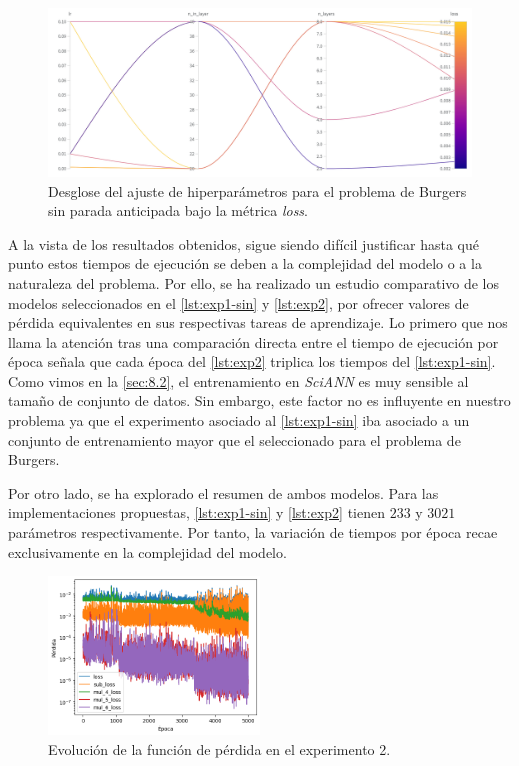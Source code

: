 \begin{figure}[htbp]
    \centering
    \includegraphics[width=1\textwidth]{img/img59.png}
    \caption{Desglose del ajuste de hiperparámetros para el problema de Burgers sin parada anticipada bajo la métrica \textit{loss}.}
    \label{fig:img59}
\end{figure}

A la vista de los resultados obtenidos, sigue siendo difícil justificar hasta qué punto estos tiempos de ejecución se deben a la complejidad del modelo o a la naturaleza del problema. Por ello, se ha realizado un estudio comparativo de los modelos seleccionados en el \autoref{lst:exp1-sin} y \autoref{lst:exp2}, por ofrecer valores de pérdida equivalentes en sus respectivas tareas de aprendizaje. Lo primero que nos llama la atención tras una comparación directa entre el tiempo de ejecución por época señala que cada época del  \autoref{lst:exp2} triplica los tiempos del \autoref{lst:exp1-sin}.  Como vimos en la \autoref{sec:8.2}, el entrenamiento en \textit{SciANN} es muy sensible al tamaño de conjunto de datos. Sin embargo, este factor no es influyente en nuestro problema ya que el experimento asociado al \autoref{lst:exp1-sin} iba asociado a un conjunto de entrenamiento mayor que el seleccionado para el problema de Burgers. 

Por otro lado, se ha explorado el resumen de ambos modelos. Para las implementaciones propuestas, \autoref{lst:exp1-sin} y \autoref{lst:exp2} tienen $233$ y $3021$ parámetros respectivamente. Por tanto, la variación de tiempos por época recae exclusivamente en la complejidad del modelo. 

\begin{figure}[htbp]
    \centering
    \includegraphics[width=0.5\textwidth]{img/img30.png}
    \caption{Evolución de la función de pérdida en el experimento 2.}
    \label{fig:img09}
\end{figure}


